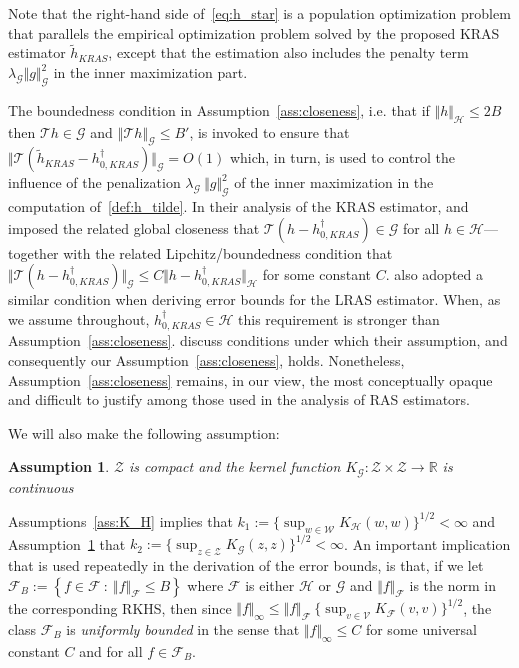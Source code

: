 \documentclass[twoside,11pt]{article}
\newtheorem{assumption}{Assumption}
\newcommand{\mc}{\mathcal}
\begin{document}
        Note that the right-hand side of~\eqref{eq:h_star} is a population optimization problem that parallels the empirical optimization problem solved by the proposed KRAS estimator $\tilde{h}_{KRAS}$, except that the estimation also includes the penalty term $\lambda_{\mc{G}}\Vert g\Vert_{\mc{G}}^2$ in the inner maximization part.
        
        The boundedness condition in Assumption~\ref{ass:closeness}, i.e. that if $\Vert h\Vert_{\mc{H}}\le 2B$ then $\mc{T}h\in\mc{G}$ and $\left\Vert\mc{T}h\right\Vert_{\mc{G}}\le B'$, is invoked to ensure that $\Vert \mc{T} (\tilde {h}_{KRAS} - h_{0,KRAS}^\dag) \Vert_\mc{G} = O(1)$ which, in turn, is used to control the influence of the penalization $\lambda_\mc{G}\: \Vert g \Vert_\mc{G}^2$ of the inner maximization in the computation of~\eqref{def:h_tilde}. In their analysis of the KRAS estimator, \citet{dikkala2020minimax} and \citet{ghassami2022minimax} imposed the related global closeness that $\mathcal{T}(h-h_{0,KRAS}^\dag) \in \mathcal{G}$ for all $h \in \mathcal{H}$---together with the related Lipchitz/boundedness condition that $\Vert \mathcal{T}(h-h_{0,KRAS}^\dag) \Vert_\mc{G} \le C \Vert h-h_{0,KRAS}^\dag \Vert_\mc{H}$ for some constant $C$. \citet{bennett2023source} also adopted a similar condition when deriving error bounds for the LRAS estimator. When, as we assume throughout, $h_{0,KRAS}^\dag \in \mc{H}$ this requirement is stronger than Assumption~\ref{ass:closeness}. \citet{dikkala2020minimax} discuss conditions under which their assumption, and consequently our Assumption~\ref{ass:closeness}, holds. Nonetheless, Assumption~\ref{ass:closeness} remains, in our view, the most conceptually opaque and difficult to justify among those used in the analysis of RAS estimators.
    

We will also make the following assumption:
\begin{assumption}
$\mc{Z}$ is compact and the kernel function $K_{\mc{G}}:\mc{Z}\times\mc{{Z}}\rightarrow\mathbb{R}$ is continuous 
\label{ass:K_G}
\end{assumption}

Assumptions~\ref{ass:K_H} implies that $k_1:=\{\sup_{w\in\mc{W}}K_{\mc{H}}(w,w)\}^{1/2} < \infty$ and Assumption~\ref{ass:K_G} that $k_2:=\{\sup_{z\in\mc{Z}}K_{\mc{G}}(z,z)\}^{1/2} < \infty$. An important implication that is used repeatedly in the derivation of the error bounds, is that, if we let 
$\mc{F}_B := \left\{f \in \mc{F} \: : \: \Vert f \Vert_{\mc{F}} \le B \right\}$ where $\mc{F}$ is either $\mc{H}$ or $\mc{G}$ and $\Vert f \Vert_{\mc{F}}$ is the norm in the corresponding RKHS, then since $\Vert f\Vert_\infty\le\Vert f\Vert_\mc{F}\:\{\sup_{v\in\mc{V}}K_\mc{F}(v,v)\}^{1/2}$, the class $\mc{F}_B$ is \textit{uniformly bounded} in the sense that $\Vert f\Vert_\infty\le C$ for some universal constant $C$ and for all $f\in\mc{F}_B$.
\end{document}
